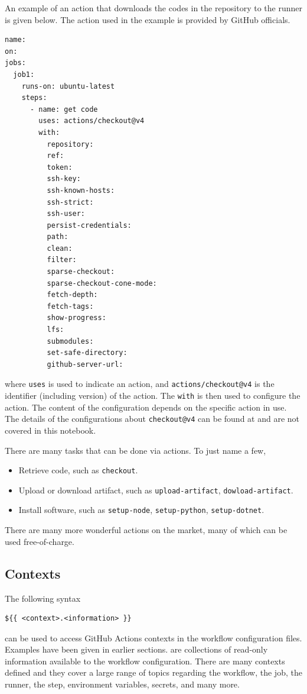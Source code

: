 An example of an action that downloads the codes in the repository to the runner is given below. The action used in the example is provided by GitHub officials.
\begin{lstlisting}
name:
on:
jobs:
  job1:
    runs-on: ubuntu-latest
    steps:
      - name: get code
        uses: actions/checkout@v4
        with:
          repository:
          ref:
          token:
          ssh-key:
          ssh-known-hosts:
          ssh-strict:
          ssh-user:
          persist-credentials:
          path:
          clean:
          filter:
          sparse-checkout:
          sparse-checkout-cone-mode:
          fetch-depth:
          fetch-tags:
          show-progress:
          lfs:
          submodules:
          set-safe-directory:
          github-server-url:
\end{lstlisting}
where \verb|uses| is used to indicate an action, and \verb|actions/checkout@v4| is the identifier (including version) of the action. The \verb|with| is then used to configure the action. The content of the configuration depends on the specific action in use. The details of the configurations about \verb|checkout@v4| can be found at \cite{git2025actions} and are not covered in this notebook. 

There are many tasks that can be done via actions. To just name a few,
\begin{itemize}
  \item Retrieve code, such as \verb|checkout|.
  \item Upload or download artifact, such as \verb|upload-artifact|, \verb|dowload-artifact|.
  \item Install software, such as \verb|setup-node|, \verb|setup-python|, \verb|setup-dotnet|.
\end{itemize}
There are many more wonderful actions on the market, many of which can be used free-of-charge.

\subsection{Contexts}

The following syntax 
\begin{lstlisting}
${{ <context>.<information> }}
\end{lstlisting}
can be used to access GitHub Actions contexts in the workflow configuration files. Examples have been given in earlier sections.  are collections of read-only information available to the workflow configuration. There are many contexts defined and they cover a large range of topics regarding the workflow, the job, the runner, the step, environment variables, secrets, and many more.

